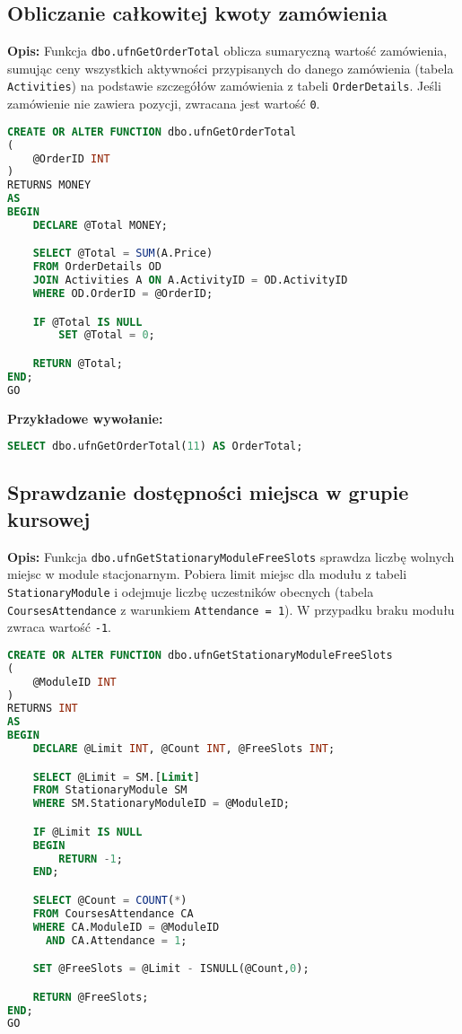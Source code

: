 \documentclass[12pt]{article}
\begin{document}
\subsection{Obliczanie całkowitej kwoty zamówienia}
\label{sec:order_total}

\textbf{Opis:} Funkcja \texttt{dbo.ufnGetOrderTotal} oblicza sumaryczną wartość zamówienia, sumując ceny wszystkich aktywności przypisanych do danego zamówienia (tabela \texttt{Activities}) na podstawie szczegółów zamówienia z tabeli \texttt{OrderDetails}. Jeśli zamówienie nie zawiera pozycji, zwracana jest wartość \texttt{0}.

 
\begin{lstlisting}[language=SQL]
CREATE OR ALTER FUNCTION dbo.ufnGetOrderTotal
(
    @OrderID INT
)
RETURNS MONEY
AS
BEGIN
    DECLARE @Total MONEY;

    SELECT @Total = SUM(A.Price)
    FROM OrderDetails OD
    JOIN Activities A ON A.ActivityID = OD.ActivityID
    WHERE OD.OrderID = @OrderID;

    IF @Total IS NULL
        SET @Total = 0;

    RETURN @Total;
END;
GO
\end{lstlisting}

\textbf{Przykładowe wywołanie:}
\begin{lstlisting}[language=SQL]
SELECT dbo.ufnGetOrderTotal(11) AS OrderTotal;
\end{lstlisting}

\newpage

\subsection{Sprawdzanie dostępności miejsca w grupie kursowej}
\label{sec:stationary_module_free_slots}

\textbf{Opis:} Funkcja \texttt{dbo.ufnGetStationaryModuleFreeSlots} sprawdza liczbę wolnych miejsc w module stacjonarnym. Pobiera limit miejsc dla modułu z tabeli \texttt{StationaryModule} i odejmuje liczbę uczestników obecnych (tabela \texttt{CoursesAttendance} z warunkiem \texttt{Attendance = 1}). W przypadku braku modułu zwraca wartość \texttt{-1}.

 
\begin{lstlisting}[language=SQL]
CREATE OR ALTER FUNCTION dbo.ufnGetStationaryModuleFreeSlots
(
    @ModuleID INT  
)
RETURNS INT
AS
BEGIN
    DECLARE @Limit INT, @Count INT, @FreeSlots INT;

    SELECT @Limit = SM.[Limit]
    FROM StationaryModule SM
    WHERE SM.StationaryModuleID = @ModuleID;

    IF @Limit IS NULL
    BEGIN
        RETURN -1;
    END;

    SELECT @Count = COUNT(*)
    FROM CoursesAttendance CA
    WHERE CA.ModuleID = @ModuleID
      AND CA.Attendance = 1;

    SET @FreeSlots = @Limit - ISNULL(@Count,0);

    RETURN @FreeSlots;
END;
GO
\end{lstlisting}
\end{document}
